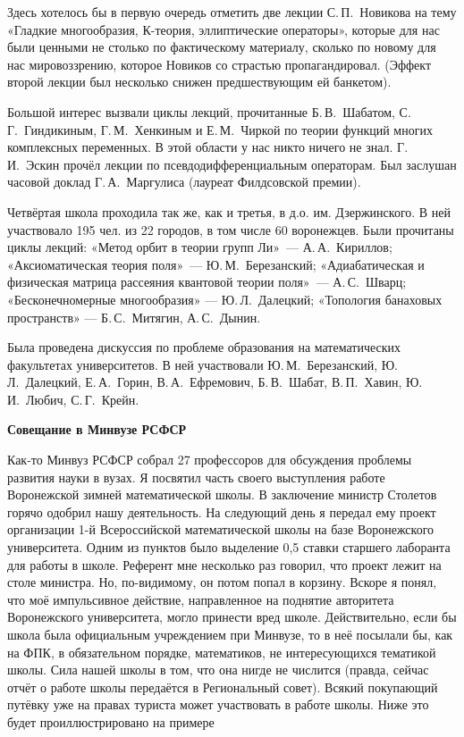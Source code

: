 Здесь хотелось бы в первую очередь отметить две лекции С.\,П.~Новикова на тему «Гладкие многообразия, К-теория, эллиптические операторы», которые для нас были ценными не столько по фактическому материалу, сколько по новому для нас мировоззрению, которое Новиков со страстью пропагандировал. (Эффект второй лекции был несколько снижен предшествующим ей банкетом).

Большой интерес вызвали циклы лекций,
прочитанные Б.\,В.~Шабатом, С.\,Г.~Гиндикиным,
Г.\,М.~Хенкиным и
\linebreak
Е.\,М.~Чиркой по теории функций многих комплексных переменных.
В этой области у нас никто ничего не знал.
Г.\,И.~Эскин прочёл лекции по псевдодифференциальным операторам. Был заслушан часовой доклад Г.\,А.~Маргулиса (лауреат Филдсовской премии).

Четвёртая школа проходила так же, как и третья, в д.о. им. Дзержинского.
В ней участвовало 195 чел. из 22 городов, в том числе 60 воронежцев.
Были прочитаны циклы лекций:
«Метод орбит в теории групп Ли»~--- А.\,А.~Кириллов;
«Аксиоматическая теория поля»~--- Ю.\,М.~Березанский;
«Адиабатическая и физическая матрица рассеяния квантовой теории поля»~--- А.\,С.~Шварц;
«Бесконечномерные многообразия» --- Ю.\,Л.~Далецкий;
«Топология банаховых пространств» --- Б.\,С.~Митягин, А.\,С.~Дынин.

Была проведена дискуссия по проблеме образования на математических факультетах университетов.
В ней участвовали Ю.\,М.~Березанский, Ю.\,Л.~Далецкий,
Е.\,А.~Горин, В.\,А.~Ефремович, Б.\,В.~Шабат, В.\,П.~Хавин, Ю.\,И.~Любич, С.\,Г.~Крейн.

{\bf Совещание в Минвузе РСФСР}

Как-то Минвуз РСФСР собрал 27 профессоров для обсуждения проблемы развития науки в вузах. Я посвятил часть своего выступления работе Воронежской зимней математической школы. В заключение министр Столетов горячо одобрил нашу деятельность. На следующий день я передал ему проект организации 1-й Всероссийской математической школы на базе Воронежского университета. Одним из пунктов было выделение 0,5 ставки старшего лаборанта для работы в школе. Референт мне несколько раз говорил, что проект лежит на столе министра. Но, по-видимому, он потом попал в корзину. Вскоре я понял, что моё импульсивное действие, направленное на поднятие авторитета Воронежского университета, могло принести вред школе. Действительно, если бы школа была официальным учреждением при Минвузе, то в неё посылали бы, как на ФПК, в обязательном порядке, математиков, не интересующихся тематикой школы. Сила нашей школы в том, что она нигде не числится (правда, сейчас отчёт о работе школы передаётся в Региональный совет). Всякий покупающий путёвку уже на правах туриста может участвовать в работе школы. Ниже это будет проиллюстрировано на примере

